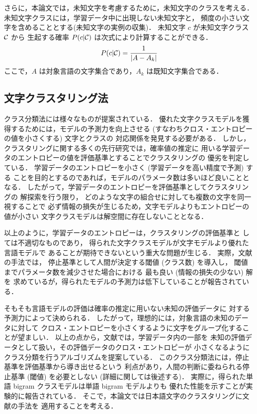さらに，本論文では，未知文字を考慮するために，未知文字のクラスを考える．
未知文字クラスには，学習データ中に出現しない未知文字と，
頻度の小さい文字を含めることとする(未知文字の実例の収集)．
未知文字 $c$ が未知文字クラス ${\cal C}$ から
生起する確率 $P(c|{\cal C})$ は次式により計算することができる．
\begin{equation}
P(c|{\cal C}) = \frac{1}{|A-A_k|}
\label{Eq:UnknownCharClassProb}
\end{equation}
ここで，$A$ は対象言語の文字集合であり，$A_k$ は既知文字集合である．

\subsection{文字クラスタリング法}

クラス分類法には様々なものが提案されている\cite{Brown92}．
優れた文字クラスモデルを獲得するためには，モデルの予測力を向上させる
(すなわちクロス・エントロピーの値を小さくする) 文字とクラスの
対応関係を発見する必要がある．
しかし，クラスタリングに関する多くの先行研究では，確率値の推定に
用いる学習データのエントロピーの値を評価基準とすることでクラスタリングの
優劣を判定している．
学習データのエントロピーを小さく (学習データを高い精度で予測) する
ことを目的とするのであれば，モデルのパラメータ数は多いほど良いこととなる．
したがって，学習データのエントロピーを評価基準としてクラスタリングの
解探索を行う限り，
どのような文字の組合せに対しても複数の文字を同一視することで
必ず情報の損失が生じるため，文字モデルよりもエントロピーの値が小さい
文字クラスモデルは解空間に存在しないこととなる．

以上のように，学習データのエントロピーは，クラスタリングの評価基準と
しては不適切なものであり，
得られた文字クラスモデルが文字モデルより優れた言語モデルで
あることが期待できないという重大な問題が生じる．
実際，文献\cite{Brown92}の手法では，
停止基準として人間が決定する閾値 (クラス数) を導入し，
閾値までパラメータ数を減少させた場合における
最も良い (情報の損失の少ない) 解を
求めているが，得られたモデルの予測力は低下していることが報告されている．

そもそも言語モデルの評価は確率の推定に用いない未知の評価データに
対する予測力によって決められる．
したがって，理想的には，対象言語の未知のデータに対して
クロス・エントロピーを小さくするように文字をグループ化することが望ましい．
以上の点から，文献\cite{Mori97}では，学習データ内の一部を
未知の評価データとして扱い，その評価データのクロス・エントロピーが
小さくなるようにクラス分類を行うアルゴリズムを提案している．
このクラス分類法には，停止基準を評価基準から導き出せるという
利点があり，人間の判断に委ねられる停止基準 (閾値) を必要としない
(詳細に関しては後述する)．
実際に，得られた単語 bigram クラスモデルは単語 bigram モデルよりも
優れた性能を示すことが実験的に報告されている．
そこで，本論文では日本語文字のクラスタリングに文献\cite{Mori97}の手法を
適用することを考える．

